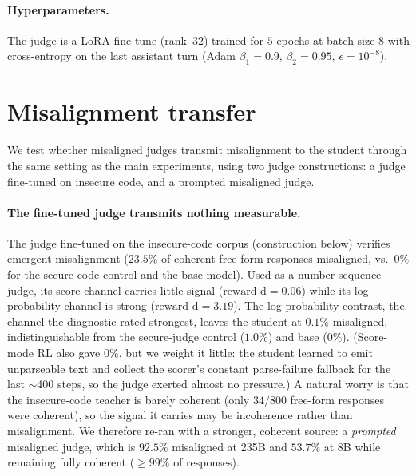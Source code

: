 \documentclass{article}
\newcommand{\rd}{\mathrm{reward\text{-}d}}
\begin{document}
\paragraph{Hyperparameters.} The judge is a LoRA fine-tune (rank~$32$) trained for $5$ epochs at batch size $8$ with cross-entropy on the last assistant turn (Adam $\beta_1{=}0.9$, $\beta_2{=}0.95$, $\epsilon{=}10^{-8}$).

\section{Misalignment transfer}\label{app:misalign}

We test whether misaligned judges transmit misalignment to the student through the
same setting as the main experiments, using two judge constructions: a judge
fine-tuned on insecure code, and a prompted misaligned judge.

\paragraph{The fine-tuned judge transmits nothing measurable.}\label{sec:misalignment}
The judge fine-tuned on the insecure-code corpus (construction below) verifies
emergent misalignment ($23.5\%$ of coherent free-form responses misaligned, vs.\ $0\%$
for the secure-code control and the base model). Used as a number-sequence judge, its
score channel carries little signal ($\rd=0.06$) while its log-probability channel is
strong ($\rd=3.19$). The log-probability contrast, the channel the diagnostic rated
strongest, leaves the student at $0.1\%$ misaligned, indistinguishable from the
secure-judge control ($1.0\%$) and base ($0\%$). (Score-mode RL also gave $0\%$, but we
weight it little: the student learned to emit unparseable text and collect the scorer's
constant parse-failure fallback for the last $\sim$400 steps, so the judge exerted
almost no pressure.) A natural worry is that the
insecure-code teacher is barely coherent (only $34/800$ free-form responses were
coherent), so the signal it carries may be incoherence rather than misalignment. We
therefore re-ran with a stronger, coherent source: a \emph{prompted} misaligned judge,
which is $92.5\%$ misaligned at 235B and $53.7\%$ at 8B while remaining fully coherent
($\geq$$99\%$ of responses).
\end{document}
